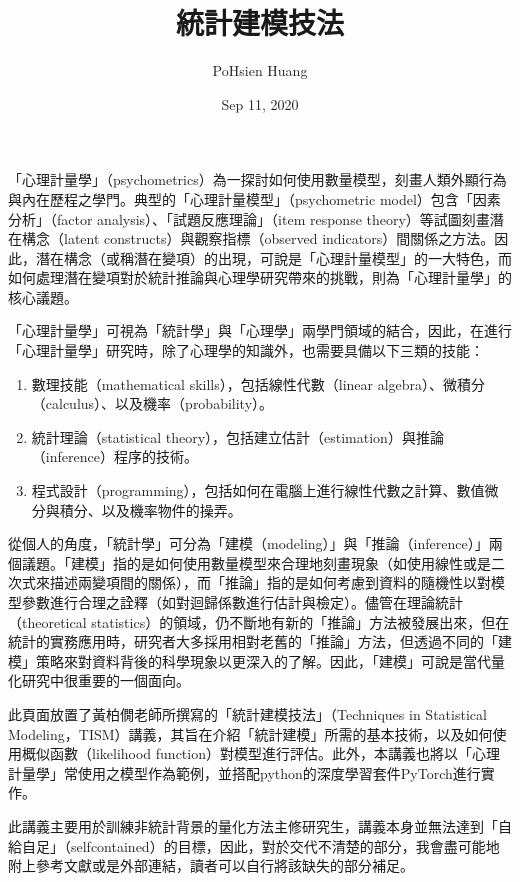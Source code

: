 \documentclass[letterpaper,10pt,english]{sphinxmanual}
\title{統計建模技法}
\date{Sep 11, 2020}
\author{Po\sphinxhyphen{}Hsien Huang}
\begin{document}
\pagestyle{empty}
\sphinxmaketitle
\pagestyle{plain}
\sphinxtableofcontents
\pagestyle{normal}
\label{\detokenize{intro::doc}}


「心理計量學」（psychometrics）為一探討如何使用數量模型，刻畫人類外顯行為與內在歷程之學門。典型的「心理計量模型」（psychometric model）包含「因素分析」（factor analysis）、「試題反應理論」（item response theory）等試圖刻畫潛在構念（latent constructs）與觀察指標（observed indicators）間關係之方法。因此，潛在構念（或稱潛在變項）的出現，可說是「心理計量模型」的一大特色，而如何處理潛在變項對於統計推論與心理學研究帶來的挑戰，則為「心理計量學」的核心議題。

「心理計量學」可視為「統計學」與「心理學」兩學門領域的結合，因此，在進行「心理計量學」研究時，除了心理學的知識外，也需要具備以下三類的技能：
\begin{enumerate}
%
\item {} 
數理技能（mathematical skills），包括線性代數（linear algebra）、微積分（calculus）、以及機率（probability）。

\item {} 
統計理論（statistical theory），包括建立估計（estimation）與推論（inference）程序的技術。

\item {} 
程式設計（programming），包括如何在電腦上進行線性代數之計算、數值微分與積分、以及機率物件的操弄。

\end{enumerate}

從個人的角度，「統計學」可分為「建模（modeling）」與「推論（inference）」兩個議題。「建模」指的是如何使用數量模型來合理地刻畫現象（如使用線性或是二次式來描述兩變項間的關係），而「推論」指的是如何考慮到資料的隨機性以對模型參數進行合理之詮釋（如對迴歸係數進行估計與檢定）。儘管在理論統計（theoretical statistics）的領域，仍不斷地有新的「推論」方法被發展出來，但在統計的實務應用時，研究者大多採用相對老舊的「推論」方法，但透過不同的「建模」策略來對資料背後的科學現象以更深入的了解。因此，「建模」可說是當代量化研究中很重要的一個面向。

此頁面放置了黃柏僩老師所撰寫的「統計建模技法」（Techniques in Statistical Modeling，TISM）講義，其旨在介紹「統計建模」所需的基本技術，以及如何使用概似函數（likelihood function）對模型進行評估。此外，本講義也將以「心理計量學」常使用之模型作為範例，並搭配python的深度學習套件PyTorch進行實作。

此講義主要用於訓練非統計背景的量化方法主修研究生，講義本身並無法達到「自給自足」（self\sphinxhyphen{}contained）的目標，因此，對於交代不清楚的部分，我會盡可能地附上參考文獻或是外部連結，讀者可以自行將該缺失的部分補足。
\end{document}
